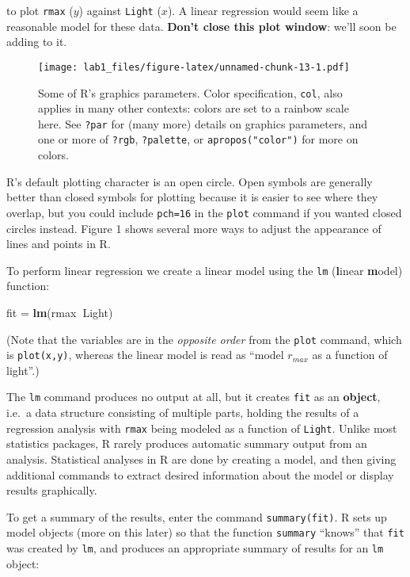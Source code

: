 \documentclass[11pt,]{article}
\newenvironment{Shaded}{\begin{snugshade}}{\end{snugshade}}
\newcommand{\KeywordTok}[1]{\textcolor[rgb]{0.13,0.29,0.53}{\textbf{#1}}}
\newcommand{\StringTok}[1]{\textcolor[rgb]{0.31,0.60,0.02}{#1}}
\newcommand{\OperatorTok}[1]{\textcolor[rgb]{0.81,0.36,0.00}{\textbf{#1}}}
\newcommand{\NormalTok}[1]{#1}
\begin{document}
to plot \texttt{rmax} (\(y\)) against \texttt{Light} (\(x\)). A linear
regression would seem like a reasonable model for these data.
\textbf{Don't close this plot window}: we'll soon be adding to it.

\begin{figure}
\centering
\texttt{[image: lab1\_files/figure-latex/unnamed-chunk-13-1.pdf]}
\caption{Some of R's graphics parameters. Color specification,
\texttt{col}, also applies in many other contexts: colors are set to a
rainbow scale here. See \texttt{?par} for (many more) details on
graphics parameters, and one or more of \texttt{?rgb},
\texttt{?palette}, or \texttt{apropos("color")} for more on colors.}
\end{figure}

R's default plotting character is an open circle. Open symbols are
generally better than closed symbols for plotting because it is easier
to see where they overlap, but you could include \texttt{pch=16} in the
\texttt{plot} command if you wanted closed circles instead. Figure 1
shows several more ways to adjust the appearance of lines and points in
R.

To perform linear regression we create a linear model using the
\texttt{lm} (\textbf{l}inear \textbf{m}odel) function:

\begin{Shaded}
\begin{Highlighting}[]
\NormalTok{fit =}\StringTok{ }\KeywordTok{lm}\NormalTok{(rmax}\OperatorTok{~}\NormalTok{Light)}
\end{Highlighting}
\end{Shaded}

(Note that the variables are in the \emph{opposite order} from the
\texttt{plot} command, which is \texttt{plot(x,y)}, whereas the linear
model is read as ``model \(r_{max}\) as a function of light''.)

The \texttt{lm} command produces no output at all, but it creates
\texttt{fit} as an \textbf{object}, i.e.~a data structure consisting of
multiple parts, holding the results of a regression analysis with
\texttt{rmax} being modeled as a function of \texttt{Light}. Unlike most
statistics packages, R rarely produces automatic summary output from an
analysis. Statistical analyses in R are done by creating a model, and
then giving additional commands to extract desired information about the
model or display results graphically.

To get a summary of the results, enter the command
\texttt{summary(fit)}. R sets up model objects (more on this later) so
that the function \texttt{summary} ``knows'' that \texttt{fit} was
created by \texttt{lm}, and produces an appropriate summary of results
for an \texttt{lm} object:
\end{document}
